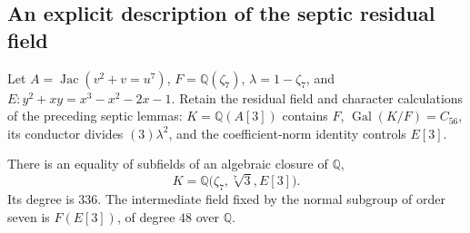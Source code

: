 \subsection{An explicit description of the septic residual field}

Let $A=\operatorname{Jac}(v^2+v=u^7)$,
$F=\mathbb Q(\zeta_7)$, $\lambda=1-\zeta_7$, and
$E:y^2+xy=x^3-x^2-2x-1$.
Retain the residual field and character calculations of the
preceding septic lemmas: $K=\mathbb Q(A[3])$ contains $F$,
$\operatorname{Gal}(K/F)=C_{56}$, its conductor divides
$(3)\lambda^2$, and the coefficient-norm identity controls
$E[3]$.

\begin{proposition}\label{prop:lm-explicit-septic-field}
There is an equality of subfields of an algebraic closure of
$\mathbb Q$,
\[
 K=\mathbb Q\bigl(\zeta_7,\sqrt[7]{3},E[3]\bigr).
\]
Its degree is $336$.  The intermediate field fixed by the
normal subgroup of order seven is
$F(E[3])$, of degree $48$ over $\mathbb Q$.
\end{proposition}
